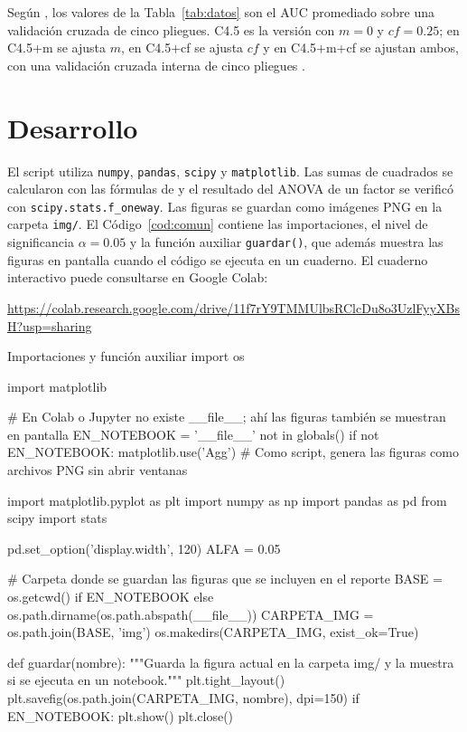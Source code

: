 \documentclass[11pt,letterpaper]{article}
\begin{document}
Según \textcite{demsar2006}, los valores de la Tabla~\ref{tab:datos} son el AUC promediado sobre una validación cruzada de cinco pliegues. C4.5 es la versión con $m = 0$ y $cf = 0.25$; en C4.5+m se ajusta $m$, en C4.5+cf se ajusta $cf$ y en C4.5+m+cf se ajustan ambos, con una validación cruzada interna de cinco pliegues \parencite{demsar2006}.

\section{Desarrollo}

El script utiliza \texttt{numpy}, \texttt{pandas}, \texttt{scipy} y \texttt{matplotlib}. Las sumas de cuadrados se calcularon con las fórmulas de \textcite{walpole2007} y el resultado del ANOVA de un factor se verificó con \texttt{scipy.stats.f\_oneway}. Las figuras se guardan como imágenes PNG en la carpeta \texttt{img/}. El Código~\ref{cod:comun} contiene las importaciones, el nivel de significancia $\alpha = 0.05$ y la función auxiliar \texttt{guardar()}, que además muestra las figuras en pantalla cuando el código se ejecuta en un cuaderno. El cuaderno interactivo puede consultarse en Google Colab:

\begin{center}
    \url{https://colab.research.google.com/drive/11f7rY9TMMUlbsRClcDu8o3UzlFyyXBsH?usp=sharing}
\end{center}

\begin{codigo}[label=cod:comun]{Importaciones y función auxiliar}
import os

import matplotlib

# En Colab o Jupyter no existe __file__; ahí las figuras también se muestran en pantalla
EN_NOTEBOOK = '__file__' not in globals()
if not EN_NOTEBOOK:
    matplotlib.use('Agg')  # Como script, genera las figuras como archivos PNG sin abrir ventanas

import matplotlib.pyplot as plt
import numpy as np
import pandas as pd
from scipy import stats

pd.set_option('display.width', 120)
ALFA = 0.05

# Carpeta donde se guardan las figuras que se incluyen en el reporte
BASE = os.getcwd() if EN_NOTEBOOK else os.path.dirname(os.path.abspath(__file__))
CARPETA_IMG = os.path.join(BASE, 'img')
os.makedirs(CARPETA_IMG, exist_ok=True)


def guardar(nombre):
    """Guarda la figura actual en la carpeta img/ y la muestra si se ejecuta en un notebook."""
    plt.tight_layout()
    plt.savefig(os.path.join(CARPETA_IMG, nombre), dpi=150)
    if EN_NOTEBOOK:
        plt.show()
    plt.close()
\end{codigo}
\end{document}
